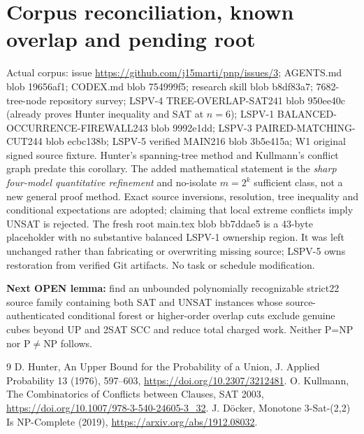 \documentclass[10pt]{article}
\begin{document}
\section{Corpus reconciliation, known overlap and pending root}
Actual corpus: issue \url{https://github.com/j15marti/pnp/issues/3}; AGENTS.md blob 19656af1; CODEX.md blob 754999f5; research skill blob b8df83a7; 7682-tree-node repository survey; LSPV-4 TREE-OVERLAP-SAT241 blob 950ee40c (already proves Hunter inequality and SAT at $n=6$); LSPV-1 BALANCED-OCCURRENCE-FIREWALL243 blob 9992e1dd; LSPV-3 PAIRED-MATCHING-CUT244 blob ecbc138b; LSPV-5 verified MAIN216 blob 3b5e415a; W1 original signed source fixture. Hunter's spanning-tree method and Kullmann's conflict graph predate this corollary. The added mathematical statement is the \emph{sharp four-model quantitative refinement} and no-isolate $m=2^k$ sufficient class, not a new general proof method. Exact source inversions, resolution, tree inequality and conditional expectations are adopted; claiming that local extreme conflicts imply UNSAT is rejected. The fresh root main.tex blob bb7ddae5 is a 43-byte placeholder with no substantive balanced LSPV-1 ownership region. It was left unchanged rather than fabricating or overwriting missing source; LSPV-5 owns restoration from verified Git artifacts. No task or schedule modification.
\par\noindent\textbf{Next OPEN lemma:} find an unbounded polynomially recognizable strict22 source family containing both SAT and UNSAT instances whose source-authenticated conditional forest or higher-order overlap cuts exclude genuine cubes beyond UP and 2SAT SCC and reduce total charged work. Neither P=NP nor P$\ne$NP follows.
\begin{thebibliography}{9}
 D. Hunter, An Upper Bound for the Probability of a Union, J. Applied Probability 13 (1976), 597--603, \url{https://doi.org/10.2307/3212481}.
 O. Kullmann, The Combinatorics of Conflicts between Clauses, SAT 2003, \url{https://doi.org/10.1007/978-3-540-24605-3_32}.
 J. D\"ocker, Monotone 3-Sat-(2,2) Is NP-Complete (2019), \url{https://arxiv.org/abs/1912.08032}.
\end{thebibliography}
\end{document}
